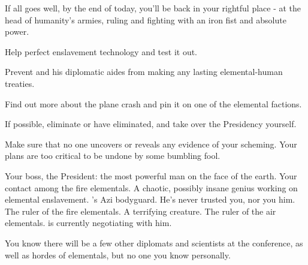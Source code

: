 \documentclass[char]{elementals}
\begin{document}
If all goes well, by the end of today, you'll be back in your rightful place - at the head of humanity's armies, ruling and fighting with an iron fist and absolute power. 

\begin{itemz}[Goals]
	\item  Help \cMS{} perfect \cMS{\their} enslavement technology and test it out.
	\item  Prevent \cLeader{} and his diplomatic aides from making any lasting elemental-human treaties.
	\item  Find out more about the plane crash and pin it on one of the elemental factions.
	\item  If possible, eliminate \cLeader{} or have \cLeader{\them} eliminated, and take over the Presidency yourself.
	\item  Make sure that no one uncovers or reveals any evidence of your scheming. Your plans are too critical to be undone by some bumbling fool.
\end{itemz}

\begin{contacts}
	\contact{\cLeader{}}  Your boss, the President: the most powerful man on the face of the earth.
	\contact{\cPyro{}}  Your contact among the fire elementals.
	\contact{\cMS{}}  A chaotic, possibly insane genius working on elemental enslavement.
	\contact{\cRomeo{}}  \cLeader{}'s Azi bodyguard. He's never trusted you, nor you him.
	\contact{\cQueen{}}  The ruler of the fire elementals. A terrifying creature.
	\contact{\cKing{}}  The ruler of the air elementals. \cLeader{} is currently negotiating with him.
\end{contacts}
You know there will be a few other diplomats and scientists at the conference, as well as hordes of elementals, but no one you know personally.
\end{document}
